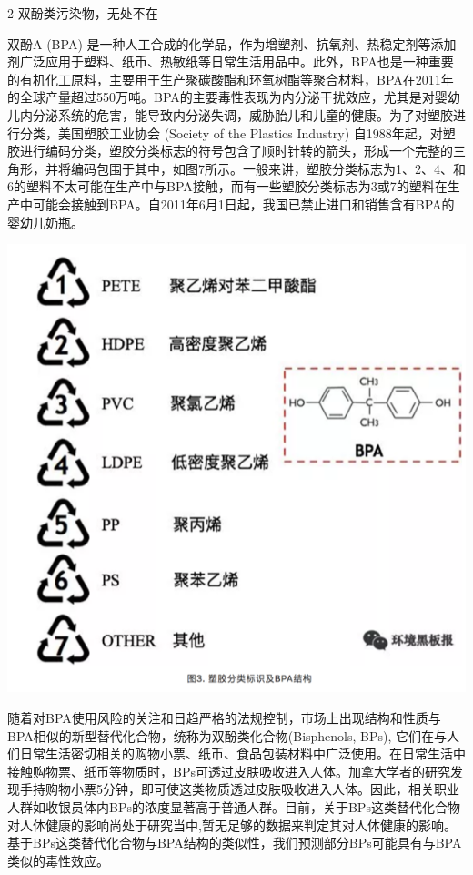 \documentclass[]{book}
\begin{document}
2 双酚类污染物，无处不在

双酚A (BPA)
是一种人工合成的化学品，作为增塑剂、抗氧剂、热稳定剂等添加剂广泛应用于塑料、纸币、热敏纸等日常生活用品中。此外，BPA也是一种重要的有机化工原料，主要用于生产聚碳酸酯和环氧树酯等聚合材料，BPA在2011年的全球产量超过550万吨。BPA的主要毒性表现为内分泌干扰效应，尤其是对婴幼儿内分泌系统的危害，能导致内分泌失调，威胁胎儿和儿童的健康。为了对塑胶进行分类，美国塑胶工业协会
(Society of the Plastics Industry)
自1988年起，对塑胶进行编码分类，塑胶分类标志的符号包含了顺时针转的箭头，形成一个完整的三角形，并将编码包围于其中，如图7所示。一般来讲，塑胶分类标志为1、2、4、和6的塑料不太可能在生产中与BPA接触，而有一些塑胶分类标志为3或7的塑料在生产中可能会接触到BPA。自2011年6月1日起，我国已禁止进口和销售含有BPA的婴幼儿奶瓶。

\includegraphics[width=8.33in]{images/epc3}

随着对BPA使用风险的关注和日趋严格的法规控制，市场上出现结构和性质与BPA相似的新型替代化合物，统称为双酚类化合物(Bisphenols,
BPs),
它们在与人们日常生活密切相关的购物小票、纸币、食品包装材料中广泛使用。在日常生活中接触购物票、纸币等物质时，BPs可透过皮肤吸收进入人体。加拿大学者的研究发现手持购物小票5分钟，即可使这类物质透过皮肤吸收进入人体。因此，相关职业人群如收银员体内BPs的浓度显著高于普通人群。目前，关于BPs这类替代化合物对人体健康的影响尚处于研究当中,暂无足够的数据来判定其对人体健康的影响。基于BPs这类替代化合物与BPA结构的类似性，我们预测部分BPs可能具有与BPA类似的毒性效应。
\end{document}
